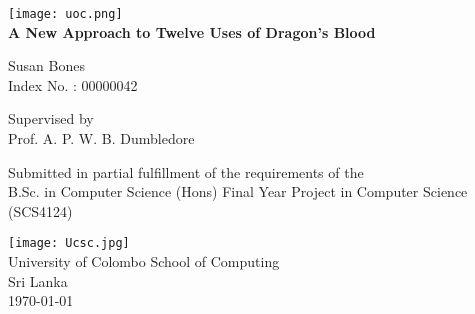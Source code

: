 \begin{titlepage}
    \begin{center}
    
		\texttt{[image: uoc.png]}\\
        \textbf{\Huge{A New Approach to Twelve Uses of Dragon's Blood}}
        
        
        \vspace{1.5cm}
        
       	{\Large{Susan Bones}}\\
        \vspace{0.3cm}
        Index No. : 00000042 
        
        \vspace{2.5cm}
        Supervised by\\
        \vspace{0.2cm}
        {\Large{Prof. A. P. W. B. Dumbledore}}\\
        \vfill
        
        Submitted in partial fulfillment of the requirements of the\\
         B.Sc. in Computer Science (Hons) 
Final Year Project in Computer Science
(SCS4124)

        
        \vspace{1.8cm}
        
        \texttt{[image: Ucsc.jpg]}\\
        \vspace{0.5cm}
        University of Colombo School  of Computing\\
        Sri Lanka\\
        \today
        
    \end{center}
\end{titlepage}